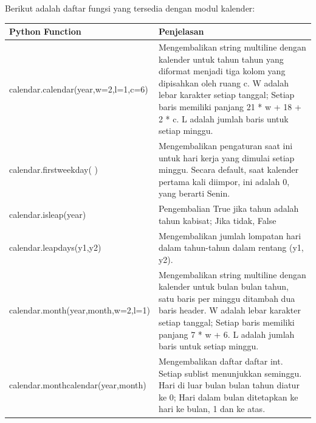 Berikut adalah daftar fungsi yang tersedia dengan modul kalender:
\begin{center}
\begin{tabular}{ | m{6cm} | m{4cm} | }
\hline
Python Function & Penjelasan \\
\hline
calendar.calendar(year,w=2,l=1,c=6) & Mengembalikan string multiline dengan kalender untuk tahun tahun yang diformat menjadi tiga kolom yang dipisahkan oleh ruang c. W adalah lebar karakter setiap tanggal; Setiap baris memiliki panjang 21 * w + 18 + 2 * c. L adalah jumlah baris untuk setiap minggu. \\
\hline
calendar.firstweekday( ) & Mengembalikan pengaturan saat ini untuk hari kerja yang dimulai setiap minggu. Secara default, saat kalender pertama kali diimpor, ini adalah 0, yang berarti Senin. \\
\hline
calendar.isleap(year) & Pengembalian True jika tahun adalah tahun kabisat; Jika tidak, False \\
\hline
calendar.leapdays(y1,y2) & Mengembalikan jumlah lompatan hari dalam tahun-tahun dalam rentang (y1, y2). \\
\hline
calendar.month(year,month,w=2,l=1) & Mengembalikan string multiline dengan kalender untuk bulan bulan tahun, satu baris per minggu ditambah dua baris header. W adalah lebar karakter setiap tanggal; Setiap baris memiliki panjang 7 * w + 6. L adalah jumlah baris untuk setiap minggu. \\
\hline
calendar.monthcalendar(year,month) & Mengembalikan daftar daftar int. Setiap sublist menunjukkan seminggu. Hari di luar bulan bulan tahun diatur ke 0; Hari dalam bulan ditetapkan ke hari ke bulan, 1 dan ke atas. \\
\hline
\end{tabular}
\end{center}

